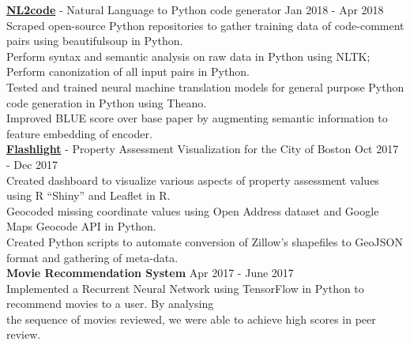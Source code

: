\documentclass[a4paper]{article}
\newcommand{\myline}{\par
  \kern2pt %
  \hrule height 0.5pt
  \kern2pt %
}
\newcommand{\mybullet}{
	\indent \textbullet \hspace*{2mm}
}
\begin{document}
			\noindent
      \textbf{\href{https://github.com/DarkestFloyd/NL2code}{NL2code}} - Natural Language to 
      Python code generator \hfill Jan 2018 - Apr 2018 \\
      \mybullet Scraped open-source Python repositories to gather training data of 
      code-comment pairs using beautifulsoup in Python. \\
      \mybullet Perform syntax and semantic analysis on raw data in Python using NLTK; Perform canonization of all input pairs in Python. \\
      \mybullet Tested and trained neural machine translation models for general purpose Python 
      code generation in Python using Theano. \\
      \mybullet Improved BLUE score over base paper by augmenting semantic information to 
      feature embedding of encoder. \\

			\noindent
      \textbf{\href{https://sichenghao1992.shinyapps.io/DS5110/}{Flashlight}} - Property 
			Assessment Visualization for the City of Boston \hfill Oct 2017 - Dec 2017 \\
      \mybullet Created dashboard to visualize various aspects of property assessment values 
      using R ``Shiny'' and Leaflet in R. \\
      \mybullet Geocoded missing coordinate values using Open Address dataset and Google Maps Geocode API in Python. \\
      \mybullet Created Python scripts to automate conversion of Zillow's shapefiles to GeoJSON format and gathering of meta-data. \\ 
			
			\noindent
			\textbf{Movie Recommendation System} \hfill Apr 2017 - June 2017\\
			\mybullet Implemented a Recurrent Neural Network using TensorFlow in Python to recommend 
      movies to a user. By analysing \\ \hspace*{9mm} the sequence of movies reviewed, we were 
      able to achieve high scores in peer review. \\ 

	
		
\end{document}
